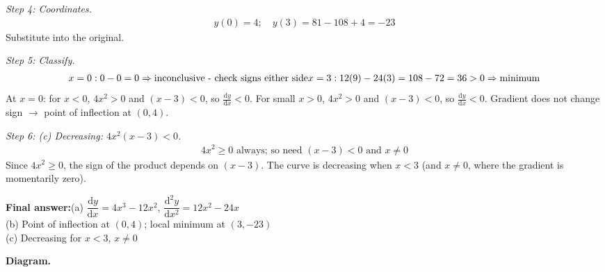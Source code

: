 \documentclass[11pt]{article}
\begin{document}
\textit{Step 4: Coordinates.}
\[\begin{gathered}
y(0) = 4; \quad y(3) = 81 - 108 + 4 = -23
\end{gathered}\]
Substitute into the original.

\textit{Step 5: Classify.}
\[\begin{gathered}
x=0: 0-0=0 \Rightarrow \text{inconclusive - check signs either side} \newline x=3: 12(9)-24(3)=108-72=36>0 \Rightarrow \text{minimum}
\end{gathered}\]
At \( x = 0 \): for \( x < 0 \), \( 4x^2 > 0 \) and \( (x-3) < 0 \), so \( \frac{\mathrm{d}y}{\mathrm{d}x} < 0 \). For small \( x > 0 \), \( 4x^2 > 0 \) and \( (x-3) < 0 \), so \( \frac{\mathrm{d}y}{\mathrm{d}x} < 0 \). Gradient does not change sign $\to$ point of inflection at \( (0, 4) \).

\textit{Step 6: (c) Decreasing: \( 4x^2(x-3) < 0 \).}
\[\begin{gathered}
4x^2 \geq 0 \text{ always; so need } (x-3) < 0 \text{ and } x \neq 0
\end{gathered}\]
Since \( 4x^2 \geq 0 \), the sign of the product depends on \( (x-3) \). The curve is decreasing when \( x < 3 \) (and \( x \neq 0 \), where the gradient is momentarily zero).

\begin{answerbox}
\textbf{Final answer:}\quad (a) \(\displaystyle  \dfrac{\mathrm{d}y}{\mathrm{d}x} = 4x^3-12x^2 \), \(\displaystyle  \dfrac{\mathrm{d}^2y}{\mathrm{d}x^2} = 12x^2-24x \) \\[3pt]  (b) Point of inflection at \(\displaystyle  (0,4) \); local minimum at \(\displaystyle  (3,-23) \) \\[3pt]  (c) Decreasing for \(\displaystyle  x < 3 \), \(\displaystyle  x \neq 0 \)
\end{answerbox}
\textbf{Diagram.}
\end{document}
